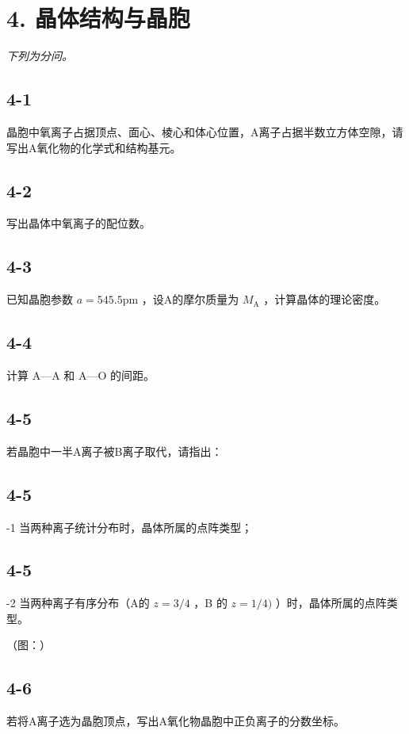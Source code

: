 \section*{4. 晶体结构与晶胞}
\textit{下列为分问。}

\subsection*{4-1}
晶胞中氧离⼦占据顶点、⾯⼼、棱⼼和体⼼位置，A离⼦占据半数⽴⽅体空隙，请写出A氧化物的化学式和结构基元。

\subsection*{4-2}
写出晶体中氧离⼦的配位数。

\subsection*{4-3}
已知晶胞参数 $a = 5 4 5 . 5 \mathrm { p m }$ ，设A的摩尔质量为 $M _ { \mathrm { A } }$ ，计算晶体的理论密度。

\subsection*{4-4}
计算 A—A 和 A—O 的间距。

\subsection*{4-5}
若晶胞中⼀半A离⼦被B离⼦取代，请指出：

\subsection*{4-5}
-1 当两种离⼦统计分布时，晶体所属的点阵类型；

\subsection*{4-5}
-2 当两种离⼦有序分布（A的 $z = 3 / 4$ ，B 的 $z = 1 / 4 )$ ）时，晶体所属的点阵类型。

（图：）

\subsection*{4-6}
若将A离⼦选为晶胞顶点，写出A氧化物晶胞中正负离⼦的分数坐标。

